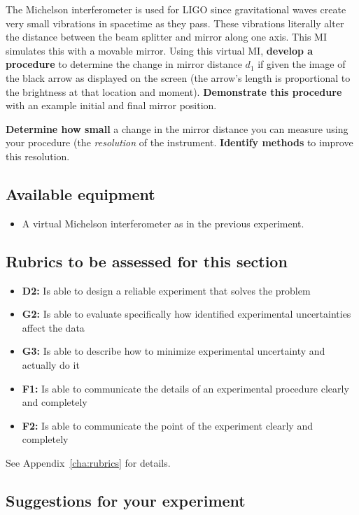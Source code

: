 The Michelson interferometer is used for LIGO since gravitational waves create very small vibrations in spacetime as they pass. These vibrations literally alter the distance between the beam splitter and mirror along one axis. This MI simulates this with a movable mirror. Using this virtual MI, \textbf{develop a procedure} to determine the change in mirror distance $d_1$ if given the image of the black arrow as displayed on the screen (the arrow's length is proportional to the brightness at that location and moment). \textbf{Demonstrate this procedure} with an example initial and final mirror position.

\textbf{Determine how small} a change in the mirror distance you can measure using your procedure (the \textit{resolution} of the instrument. \textbf{Identify methods} to improve this resolution. 

\subsection{Available equipment}

\begin{itemize}
	\item A virtual Michelson interferometer as in the previous experiment.
\end{itemize}

\subsection{Rubrics to be assessed for this section}

\begin{itemize}
	\item \textbf{D2:} Is able to design a reliable experiment that solves the problem
	\item \textbf{G2:} Is able to evaluate specifically how identified experimental uncertainties affect the data
	\item \textbf{G3:} Is able to describe how to minimize experimental uncertainty and actually do it
	\item \textbf{F1:} Is able to communicate the details of an experimental procedure clearly and completely
	\item \textbf{F2:} Is able to communicate the point of the experiment clearly and completely
\end{itemize}

See Appendix~\ref{cha:rubrics} for details.

\subsection{Suggestions for your experiment}

